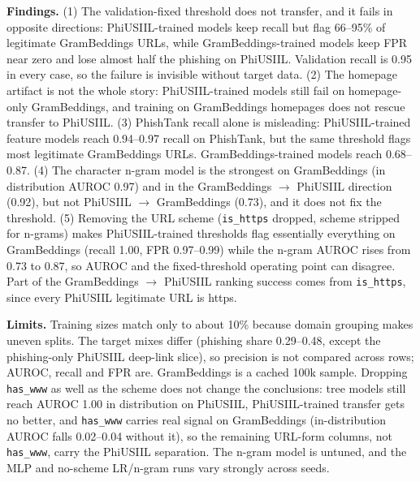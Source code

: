 \documentclass[10pt]{article}
\begin{document}
\textbf{Findings.} (1) The validation-fixed threshold does not transfer, and it fails in opposite directions: PhiUSIIL-trained models keep recall but flag 66--95\% of legitimate GramBeddings URLs, while GramBeddings-trained models keep FPR near zero and lose almost half the phishing on PhiUSIIL. Validation recall is 0.95 in every case, so the failure is invisible without target data. (2) The homepage artifact is not the whole story: PhiUSIIL-trained models still fail on homepage-only GramBeddings, and training on GramBeddings homepages does not rescue transfer to PhiUSIIL. (3) PhishTank recall alone is misleading: PhiUSIIL-trained feature models reach 0.94--0.97 recall on PhishTank, but the same threshold flags most legitimate GramBeddings URLs. GramBeddings-trained models reach 0.68--0.87. (4) The character n-gram model is the strongest on GramBeddings (in distribution AUROC 0.97) and in the GramBeddings $\to$ PhiUSIIL direction (0.92), but not PhiUSIIL $\to$ GramBeddings (0.73), and it does not fix the threshold. (5) Removing the URL scheme (\texttt{is\_https} dropped, scheme stripped for n-grams) makes PhiUSIIL-trained thresholds flag essentially everything on GramBeddings (recall 1.00, FPR 0.97--0.99) while the n-gram AUROC rises from 0.73 to 0.87, so AUROC and the fixed-threshold operating point can disagree. Part of the GramBeddings $\to$ PhiUSIIL ranking success comes from \texttt{is\_https}, since every PhiUSIIL legitimate URL is https.

\textbf{Limits.} Training sizes match only to about 10\% because domain grouping makes uneven splits. The target mixes differ (phishing share 0.29--0.48, except the phishing-only PhiUSIIL deep-link slice), so precision is not compared across rows; AUROC, recall and FPR are. GramBeddings is a cached 100k sample. Dropping \texttt{has\_www} as well as the scheme does not change the conclusions: tree models still reach AUROC 1.00 in distribution on PhiUSIIL, PhiUSIIL-trained transfer gets no better, and \texttt{has\_www} carries real signal on GramBeddings (in-distribution AUROC falls 0.02--0.04 without it), so the remaining URL-form columns, not \texttt{has\_www}, carry the PhiUSIIL separation. The n-gram model is untuned, and the MLP and no-scheme LR/n-gram runs vary strongly across seeds.
\end{document}
